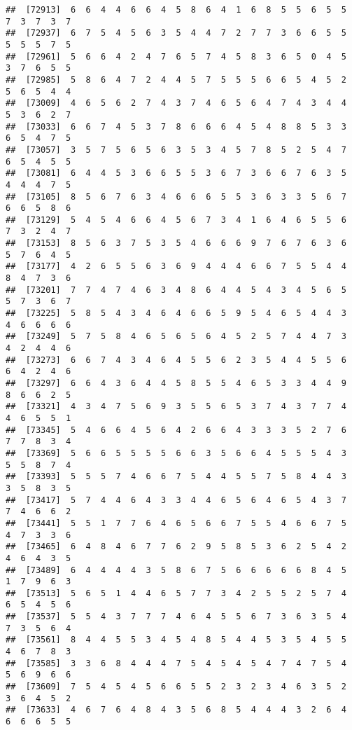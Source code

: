 \documentclass[
]{book}
\begin{document}
\begin{verbatim}
##  [72913]  6  6  4  4  6  6  4  5  8  6  4  1  6  8  5  5  6  5  5  7  3  7  3  7
##  [72937]  6  7  5  4  5  6  3  5  4  4  7  2  7  7  3  6  6  5  5  5  5  5  7  5
##  [72961]  5  6  6  4  2  4  7  6  5  7  4  5  8  3  6  5  0  4  5  3  7  6  5  5
##  [72985]  5  8  6  4  7  2  4  4  5  7  5  5  5  6  6  5  4  5  2  5  6  5  4  4
##  [73009]  4  6  5  6  2  7  4  3  7  4  6  5  6  4  7  4  3  4  4  5  3  6  2  7
##  [73033]  6  6  7  4  5  3  7  8  6  6  6  4  5  4  8  8  5  3  3  6  5  4  7  5
##  [73057]  3  5  7  5  6  5  6  3  5  3  4  5  7  8  5  2  5  4  7  6  5  4  5  5
##  [73081]  6  4  4  5  3  6  6  5  5  3  6  7  3  6  6  7  6  3  5  4  4  4  7  5
##  [73105]  8  5  6  7  6  3  4  6  6  6  5  5  3  6  3  3  5  6  7  6  6  5  8  6
##  [73129]  5  4  5  4  6  6  4  5  6  7  3  4  1  6  4  6  5  5  6  7  3  2  4  7
##  [73153]  8  5  6  3  7  5  3  5  4  6  6  6  9  7  6  7  6  3  6  5  7  6  4  5
##  [73177]  4  2  6  5  5  6  3  6  9  4  4  4  6  6  7  5  5  4  4  8  4  7  3  6
##  [73201]  7  7  4  7  4  6  3  4  8  6  4  4  5  4  3  4  5  6  5  5  7  3  6  7
##  [73225]  5  8  5  4  3  4  6  4  6  6  5  9  5  4  6  5  4  4  3  4  6  6  6  6
##  [73249]  5  7  5  8  4  6  5  6  5  6  4  5  2  5  7  4  4  7  3  4  2  4  4  6
##  [73273]  6  6  7  4  3  4  6  4  5  5  6  2  3  5  4  4  5  5  6  6  4  2  4  6
##  [73297]  6  6  4  3  6  4  4  5  8  5  5  4  6  5  3  3  4  4  9  8  6  6  2  5
##  [73321]  4  3  4  7  5  6  9  3  5  5  6  5  3  7  4  3  7  7  4  4  6  5  5  1
##  [73345]  5  4  6  6  4  5  6  4  2  6  6  4  3  3  3  5  2  7  6  7  7  8  3  4
##  [73369]  5  6  6  5  5  5  5  6  6  3  5  6  6  4  5  5  5  4  3  5  5  8  7  4
##  [73393]  5  5  5  7  4  6  6  7  5  4  4  5  5  7  5  8  4  4  3  3  5  8  3  5
##  [73417]  5  7  4  4  6  4  3  3  4  4  6  5  6  4  6  5  4  3  7  7  4  6  6  2
##  [73441]  5  5  1  7  7  6  4  6  5  6  6  7  5  5  4  6  6  7  5  4  7  3  3  6
##  [73465]  6  4  8  4  6  7  7  6  2  9  5  8  5  3  6  2  5  4  2  4  6  4  3  5
##  [73489]  6  4  4  4  4  3  5  8  6  7  5  6  6  6  6  6  8  4  5  1  7  9  6  3
##  [73513]  5  6  5  1  4  4  6  5  7  7  3  4  2  5  5  2  5  7  4  6  5  4  5  6
##  [73537]  5  5  4  3  7  7  7  4  6  4  5  5  6  7  3  6  3  5  4  7  3  5  6  4
##  [73561]  8  4  4  5  5  3  4  5  4  8  5  4  4  5  3  5  4  5  5  4  6  7  8  3
##  [73585]  3  3  6  8  4  4  4  7  5  4  5  4  5  4  7  4  7  5  4  5  6  9  6  6
##  [73609]  7  5  4  5  4  5  6  6  5  5  2  3  2  3  4  6  3  5  2  3  6  4  5  2
##  [73633]  4  6  7  6  4  8  4  3  5  6  8  5  4  4  4  3  2  6  4  6  6  6  5  5

\end{verbatim}
\end{document}
